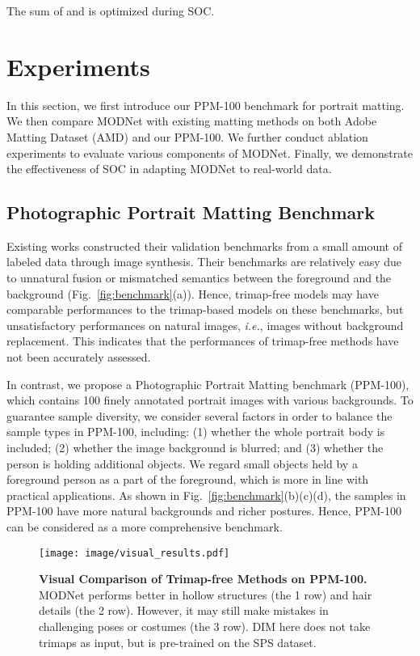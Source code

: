 \documentclass[letterpaper]{article} \usepackage{aaai22}  \usepackage{times}  \usepackage{helvet}  \usepackage{courier}  \usepackage[hyphens]{url}  \usepackage{graphicx} \urlstyle{rm} \def\UrlFont{\rm}  \usepackage{natbib}  \usepackage{caption} \usepackage{booktabs}
\begin{document}
The sum of  and  is optimized during SOC.




\section{Experiments}
In this section, we first introduce our PPM-100 benchmark for portrait matting. We then compare MODNet with existing matting methods on both Adobe Matting Dataset (AMD) \cite{DIM} and our PPM-100. We further conduct ablation experiments to evaluate various components of MODNet. Finally, we demonstrate the effectiveness of SOC in adapting MODNet to real-world data.

\subsection{Photographic Portrait Matting Benchmark}\label{sec:benchmark}
Existing works constructed their validation benchmarks from a small amount of labeled data through image synthesis. Their benchmarks are relatively easy due to unnatural fusion or mismatched semantics between the foreground and the background (Fig.~\ref{fig:benchmark}(a)). Hence, trimap-free models may have comparable performances to the trimap-based models on these benchmarks, but unsatisfactory performances on natural images, {\it i.e.}, images without background replacement. This indicates that the performances of trimap-free methods have not been accurately assessed. 

In contrast, we propose a Photographic Portrait Matting benchmark (PPM-100), which contains 100 finely annotated portrait images with various backgrounds. To guarantee sample diversity, we consider several factors in order to balance the sample types in PPM-100, including: (1) whether the whole portrait body is included; (2) whether the image background is blurred; and (3) whether the person is holding additional objects. We regard small objects held by a foreground person as a part of the foreground, which is more in line with practical applications. 
As shown in Fig.~\ref{fig:benchmark}(b)(c)(d), the samples in PPM-100 have more natural backgrounds and richer postures. Hence, PPM-100 can be considered as a more comprehensive benchmark.

\begin{figure*}[ht]
\begin{center}
  \texttt{[image: image/visual\_results.pdf]}
\end{center}
  \caption{\textbf{Visual Comparison of Trimap-free Methods on PPM-100.}
    MODNet performs better in hollow structures (the 1 row) and hair details (the 2 row). However, it may still make mistakes in challenging poses or costumes (the 3 row). DIM \cite{DIM} here does not take trimaps as input, but is pre-trained on the SPS \cite{SPS} dataset. 
  }
\label{fig:visual_results}
\end{figure*}
\end{document}
